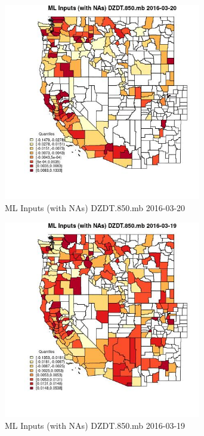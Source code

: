 \begin{figure} 
\centering  
\includegraphics[width=0.77\textwidth]{Code_Outputs/Report_ML_input_PM25_Step4_part_e_de_duplicated_aveswNAs_CountyDZDT850mbMean2016-03-20_2016-03-20.jpg} 
\caption{\label{fig:Report_ML_input_PM25_Step4_part_e_de_duplicated_aveswNAsCountyDZDT850mbMean2016-03-20_2016-03-20}ML Inputs (with NAs) DZDT.850.mb 2016-03-20} 
\end{figure} 
 

\begin{figure} 
\centering  
\includegraphics[width=0.77\textwidth]{Code_Outputs/Report_ML_input_PM25_Step4_part_e_de_duplicated_aveswNAs_CountyDZDT850mbMean2016-03-19_2016-03-19.jpg} 
\caption{\label{fig:Report_ML_input_PM25_Step4_part_e_de_duplicated_aveswNAsCountyDZDT850mbMean2016-03-19_2016-03-19}ML Inputs (with NAs) DZDT.850.mb 2016-03-19} 
\end{figure} 
 

